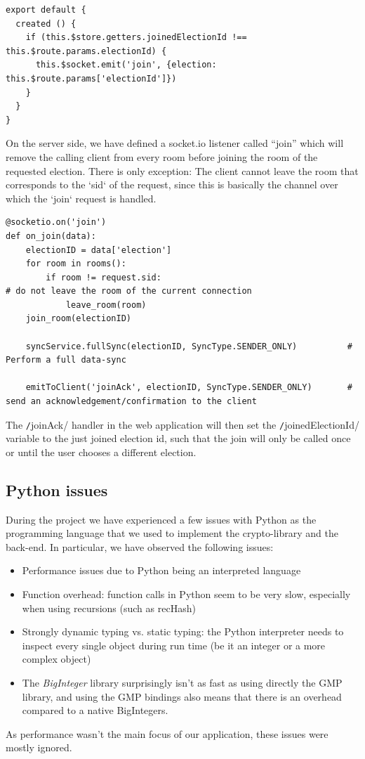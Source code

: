 \begin{verbatim}
export default {
  created () {
    if (this.$store.getters.joinedElectionId !== this.$route.params.electionId) {
      this.$socket.emit('join', {election: this.$route.params['electionId']})
    }
  }
}
\end{verbatim}
On the server side, we have defined a socket.io listener called "`join"' which will remove the calling client from every room before joining the room of the requested election. There is only exception: The client cannot leave the room that corresponds to the `sid` of the request, since this is basically the channel over which the `join` request is handled.
\begin{verbatim}
@socketio.on('join')
def on_join(data):
    electionID = data['election']
    for room in rooms():
        if room != request.sid:																	# do not leave the room of the current connection
            leave_room(room)
    join_room(electionID)

    syncService.fullSync(electionID, SyncType.SENDER_ONLY)			# Perform a full data-sync

    emitToClient('joinAck', electionID, SyncType.SENDER_ONLY)		# send an acknowledgement/confirmation to the client
\end{verbatim}

The \texttt/joinAck/ handler in the web application will then set the \texttt/joinedElectionId/ variable to the just joined election id, such that the join will only be called once or until the user chooses a different election.

\subsection{Python issues} \label{ssec:PythonIssues}

During the project we have experienced a few issues with Python as the programming language that we used to implement the crypto-library and the back-end. In particular, we have observed the following issues:

\begin{itemize}
	\item Performance issues due to Python being an interpreted language
	\item Function overhead: function calls in Python seem to be very slow, especially when using recursions (such as recHash)
	\item Strongly dynamic typing vs. static typing: the Python interpreter needs to inspect every single object during run time (be it an integer or a more complex object)
	\item The \textit{BigInteger} library surprisingly isn't as fast as using directly the GMP library, and using the GMP bindings also means that there is an overhead compared to a native BigIntegers.
\end{itemize}
As performance wasn't the main focus of our application, these issues were mostly ignored.

